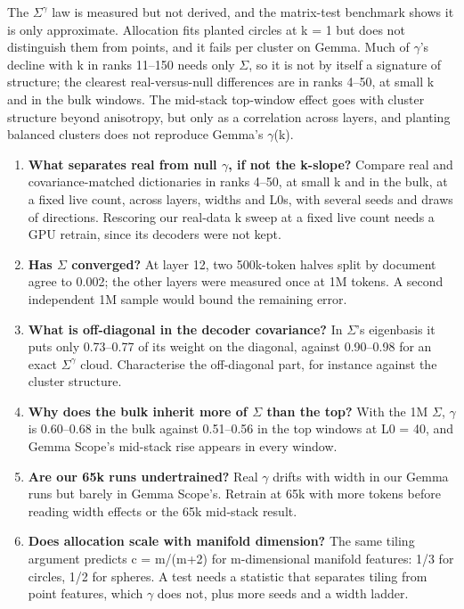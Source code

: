 \documentclass[11pt]{article}
\begin{document}
The $\Sigma^{\gamma}$ law is measured but not derived, and the matrix-test benchmark shows it is only approximate. Allocation fits planted circles at k = 1 but does not distinguish them from points, and it fails per cluster on Gemma. Much of $\gamma$'s decline with k in ranks 11--150 needs only $\Sigma$, so it is not by itself a signature of structure; the clearest real-versus-null differences are in ranks 4--50, at small k and in the bulk windows. The mid-stack top-window effect goes with cluster structure beyond anisotropy, but only as a correlation across layers, and planting balanced clusters does not reproduce Gemma's $\gamma$(k).

\begin{enumerate}
\item \textbf{What separates real from null $\gamma$, if not the k-slope?} Compare real and covariance-matched dictionaries in ranks 4--50, at small k and in the bulk, at a fixed live count, across layers, widths and L0s, with several seeds and draws of directions. Rescoring our real-data k sweep at a fixed live count needs a GPU retrain, since its decoders were not kept.
\item \textbf{Has $\Sigma$ converged?} At layer 12, two 500k-token halves split by document agree to 0.002; the other layers were measured once at 1M tokens. A second independent 1M sample would bound the remaining error.
\item \textbf{What is off-diagonal in the decoder covariance?} In $\Sigma$'s eigenbasis it puts only 0.73--0.77 of its weight on the diagonal, against 0.90--0.98 for an exact $\Sigma^{\gamma}$ cloud. Characterise the off-diagonal part, for instance against the cluster structure.
\item \textbf{Why does the bulk inherit more of $\Sigma$ than the top?} With the 1M $\Sigma$, $\gamma$ is 0.60--0.68 in the bulk against 0.51--0.56 in the top windows at L0 = 40, and Gemma Scope's mid-stack rise appears in every window.
\item \textbf{Are our 65k runs undertrained?} Real $\gamma$ drifts with width in our Gemma runs but barely in Gemma Scope's. Retrain at 65k with more tokens before reading width effects or the 65k mid-stack result.
\item \textbf{Does allocation scale with manifold dimension?} The same tiling argument predicts c = m/(m+2) for m-dimensional manifold features: 1/3 for circles, 1/2 for spheres. A test needs a statistic that separates tiling from point features, which $\gamma$ does not, plus more seeds and a width ladder.

\end{enumerate}
\end{document}
